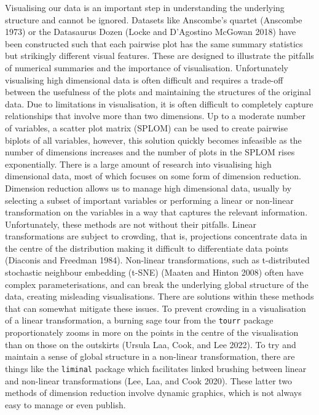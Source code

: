 Visualising our data is an important step in understanding the underlying structure and cannot be ignored. Datasets like Anscombe's quartet (Anscombe 1973) or the Datasaurus Dozen (Locke and D'Agostino McGowan 2018) have been constructed such that each pairwise plot has the same summary statistics but strikingly different visual features. These are designed to illustrate the pitfalls of numerical summaries and the importance of visualisation. Unfortunately visualising high dimensional data is often difficult and requires a trade-off between the usefulness of the plots and maintaining the structures of the original data. Due to limitations in visualisation, it is often difficult to completely capture relationships that involve more than two dimensions. Up to a moderate number of variables, a scatter plot matrix (SPLOM) can be used to create pairwise biplots of all variables, however, this solution quickly becomes infeasible as the number of dimensions increases and the number of plots in the SPLOM rises exponentially. There is a large amount of research into visualising high dimensional data, most of which focuses on some form of dimension reduction.
Dimension reduction allows us to manage high dimensional data, usually by selecting a subset of important variables or performing a linear or non-linear transformation on the variables in a way that captures the relevant information. Unfortunately, these methods are not without their pitfalls. Linear transformations are subject to crowding, that is, projections concentrate data in the centre of the distribution making it difficult to differentiate data points (Diaconis and Freedman 1984). Non-linear transformations, such as t-distributed stochastic neighbour embedding (t-SNE) (Maaten and Hinton 2008) often have complex parameterisations, and can break the underlying global structure of the data, creating misleading visualisations. There are solutions within these methods that can somewhat mitigate these issues. To prevent crowding in a visualisation of a linear transformation, a burning sage tour from the \texttt{tourr} package proportionately zooms in more on the points in the centre of the visualisation than on those on the outskirts (Ursula Laa, Cook, and Lee 2022). To try and maintain a sense of global structure in a non-linear transformation, there are things like the \texttt{liminal} package which facilitates linked brushing between linear and non-linear transformations (Lee, Laa, and Cook 2020). These latter two methods of dimension reduction involve dynamic graphics, which is not always easy to manage or even publish.

